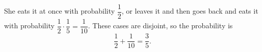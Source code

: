 She eats it at once with probability $\dfrac12$, or leaves it and then goes back and eats it with probability $\dfrac12\cdot\dfrac15=\dfrac{1}{10}$. These cases are disjoint, so the probability is
\[\dfrac12+\dfrac{1}{10}=\boxed{\dfrac35}.\]
